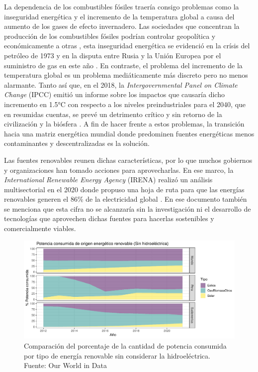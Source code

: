 
La dependencia de los combustibles fósiles traería consigo problemas como la inseguridad energética y el incremento de la temperatura global a causa del aumento de los gases de efecto invernadero. Las sociedades que concentran la producción de los combustibles fósiles podrían controlar geopolítica y económicamente a otras \cite{mayer2022fossil}, esta inseguridad energética se evidenció en la crísis del petróleo de 1973 \cite{vernon1976oil} y en la disputa entre Rusia y la Unión Europea por el suministro de gas en este año \cite{rodriguez2022improving}. En contraste, el problema del incremento de la temperatura global es un problema mediáticamente más discreto pero no menos alarmante. Tanto así que, en el 2018, la \textit{Intergovernmental Panel on Climate Change} (IPCC) emitió un informe sobre los impactos que causaría dicho incremento en 1.5°C con respecto a los niveles preindustriales para el 2040, que en resumidas cuentas, se prevé un detrimento crítico y sin retorno de la civilización y la biósfera \cite{guilyardi2018ipcc}. A fin de hacer frente a estos problemas, la transición hacia una matriz energética mundial donde predominen fuentes energéticas menos contaminantes y descentralizadas es la solución. 



Las fuentes renovables reunen dichas características, por lo que muchos gobiernos y organizaciones han tomado acciones para aprovecharlas. En ese marco, la \textit{International Renewable Energy Agency} (IRENA) realizó un análisis multisectorial en el 2020 donde propuso una hoja de ruta para que las energías renovables generen el 86\% de la electricidad global \cite{asmelash2020role}. En ese documento también se menciona que esta cifra no se alcanzaría sin la investigación ni el desarrollo de tecnologías que aprovechen dichas fuentes para hacerlas sostenibles y comercialmente viables.

\begin{figure}[!ht]
    \begin{center}
        \includegraphics[scale=0.7]{img/renovables.pdf}
    \end{center}
    \caption{Comparación del porcentaje de la cantidad de potencia consumida por tipo de energía renovable sin considerar la hidroeléctrica.
    Fuente: Our World in Data \cite{owidenergy}}
    \label{img:PorcentajeRenovable}
\end{figure}

